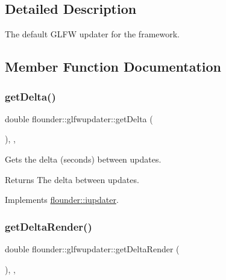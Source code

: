 \subsection{Detailed Description}
The default G\+L\+FW updater for the framework. 



\subsection{Member Function Documentation}
\mbox{\label{classflounder_1_1glfwupdater_a8da4916f3335126413a072203b94a735}} 
\subsubsection{\texorpdfstring{get\+Delta()}{getDelta()}}
{\footnotesize\ttfamily double flounder\+::glfwupdater\+::get\+Delta (\begin{DoxyParamCaption}{ }\end{DoxyParamCaption})\hspace{0.3cm}{\ttfamily [inline]}, {\ttfamily [override]}, {\ttfamily [virtual]}}



Gets the delta (seconds) between updates. 

\begin{DoxyReturn}{Returns}
The delta between updates. 
\end{DoxyReturn}


Implements \hyperlink{classflounder_1_1iupdater_a1e8d40602f9799fc82d96d5b845cf796}{flounder\+::iupdater}.

\mbox{\label{classflounder_1_1glfwupdater_a3f8d8a108c8db0d2ead35088646687c9}} 
\subsubsection{\texorpdfstring{get\+Delta\+Render()}{getDeltaRender()}}
{\footnotesize\ttfamily double flounder\+::glfwupdater\+::get\+Delta\+Render (\begin{DoxyParamCaption}{ }\end{DoxyParamCaption})\hspace{0.3cm}{\ttfamily [inline]}, {\ttfamily [override]}, {\ttfamily [virtual]}}



